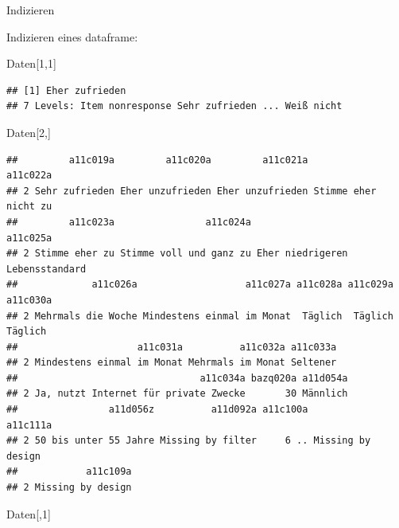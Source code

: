 \documentclass[ignorenonframetext,]{beamer}
\newenvironment{Shaded}{}{}
\newcommand{\DecValTok}[1]{\textcolor[rgb]{0.25,0.63,0.44}{{#1}}}
\newcommand{\NormalTok}[1]{{#1}}
\begin{document}
\begin{frame}[fragile]{Indizieren}

Indizieren eines dataframe:

\begin{Shaded}
\begin{Highlighting}[]
\NormalTok{Daten[}\DecValTok{1}\NormalTok{,}\DecValTok{1}\NormalTok{]}
\end{Highlighting}
\end{Shaded}

\begin{verbatim}
## [1] Eher zufrieden
## 7 Levels: Item nonresponse Sehr zufrieden ... Weiß nicht
\end{verbatim}

\begin{Shaded}
\begin{Highlighting}[]
\NormalTok{Daten[}\DecValTok{2}\NormalTok{,]}
\end{Highlighting}
\end{Shaded}

\begin{verbatim}
##         a11c019a         a11c020a         a11c021a             a11c022a
## 2 Sehr zufrieden Eher unzufrieden Eher unzufrieden Stimme eher nicht zu
##         a11c023a                a11c024a                        a11c025a
## 2 Stimme eher zu Stimme voll und ganz zu Eher niedrigeren Lebensstandard
##             a11c026a                   a11c027a a11c028a a11c029a a11c030a
## 2 Mehrmals die Woche Mindestens einmal im Monat  Täglich  Täglich  Täglich
##                     a11c031a          a11c032a a11c033a
## 2 Mindestens einmal im Monat Mehrmals im Monat Seltener
##                                a11c034a bazq020a a11d054a
## 2 Ja, nutzt Internet für private Zwecke       30 Männlich
##                a11d056z          a11d092a a11c100a          a11c111a
## 2 50 bis unter 55 Jahre Missing by filter     6 .. Missing by design
##            a11c109a
## 2 Missing by design
\end{verbatim}

\begin{Shaded}
\begin{Highlighting}[]
\NormalTok{Daten[,}\DecValTok{1}\NormalTok{]}
\end{Highlighting}
\end{Shaded}


\end{frame}
\end{document}
